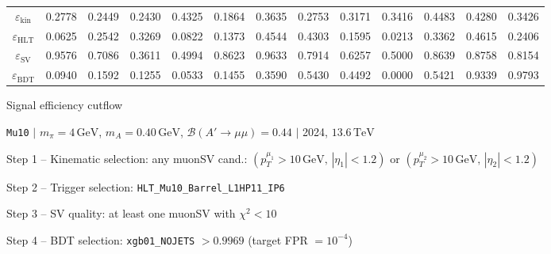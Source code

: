 \documentclass[10pt,a4paper]{article}
\begin{document}
\begin{landscape}
{\begin{tabular}{c|cccc|cccc|cccc}
\midrule
$\varepsilon_{\mathrm{kin}}$ & 0.2778 & 0.2449 & 0.2430 & 0.4325 & 0.1864 & 0.3635 & 0.2753 & 0.3171 & 0.3416 & 0.4483 & 0.4280 & 0.3426\\
$\varepsilon_{\mathrm{HLT}}$ & 0.0625 & 0.2542 & 0.3269 & 0.0822 & 0.1373 & 0.4544 & 0.4303 & 0.1595 & 0.0213 & 0.3362 & 0.4615 & 0.2406\\
$\varepsilon_{\mathrm{SV}}$ & 0.9576 & 0.7086 & 0.3611 & 0.4994 & 0.8623 & 0.9633 & 0.7914 & 0.6257 & 0.5000 & 0.8639 & 0.8758 & 0.8154\\
$\varepsilon_{\mathrm{BDT}}$ & 0.0940 & 0.1592 & 0.1255 & 0.0533 & 0.1455 & 0.3590 & 0.5430 & 0.4492 & 0.0000 & 0.5421 & 0.9339 & 0.9793\\
\bottomrule
\end{tabular}}

\end{landscape}
\clearpage

{\large Signal efficiency cutflow

 \texttt{Mu10} $|$ $m_{\pi}=4\,\mathrm{GeV}$, $m_{A}=0.40\,\mathrm{GeV}$, $\mathcal{B}(A'\!\to\!\mu\mu)=0.44$ $|$ 2024, $13.6\,\mathrm{TeV}$}

\vspace{0.8em}

Step 1 -- Kinematic selection: any muonSV cand.: $(p_T^{\mu_1}{>}10\,\mathrm{GeV},\,|\eta_1|{<}1.2)$ or $(p_T^{\mu_2}{>}10\,\mathrm{GeV},\,|\eta_2|{<}1.2)$

Step 2 -- Trigger selection: \texttt{HLT\_Mu10\_Barrel\_L1HP11\_IP6}

Step 3 -- SV quality: at least one muonSV with $\chi^2<10$

Step 4 -- BDT selection: \texttt{xgb01\_NOJETS} $>0.9969$ (target FPR $=10^{-4}$)

\vspace{0.8em}
\end{document}
